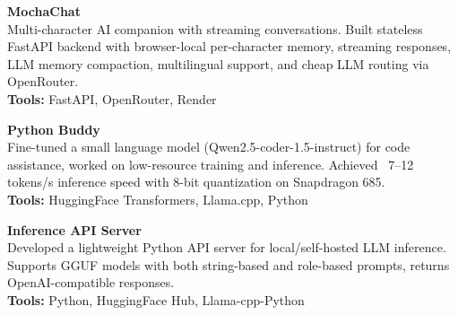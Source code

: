 
\begin{cvlistsection}

\item \textbf{MochaChat} \href{https://github.com/2ufiq/mocha-chat}{\faGithub}  \href{https://mocha-chat.onrender.com/}{\textcolor{Cerulean}{\faExternalLink*}}\\
Multi-character AI companion with streaming conversations. Built stateless FastAPI backend with browser-local per-character memory, streaming responses, LLM memory compaction, multilingual support, and cheap LLM routing via OpenRouter.\\
\textbf{Tools:} FastAPI, OpenRouter, Render

\item \textbf{Python Buddy} \href{https://github.com/2ufiq/slm-python-buddy}{\faGithub}\\
Fine-tuned a small language model (Qwen2.5-coder-1.5-instruct) for code assistance, worked on low-resource training and inference. Achieved ~7–12 tokens/s inference speed with 8-bit quantization on Snapdragon 685.\\
\textbf{Tools:} HuggingFace Transformers, Llama.cpp, Python

\item \textbf{Inference API Server} \href{https://github.com/2ufiq/slm-api-server}{\faGithub}\\
Developed a lightweight Python API server for local/self-hosted LLM inference. Supports GGUF models with both string-based and role-based prompts, returns OpenAI-compatible responses.\\
\textbf{Tools:} Python, HuggingFace Hub, Llama-cpp-Python




\end{cvlistsection}

